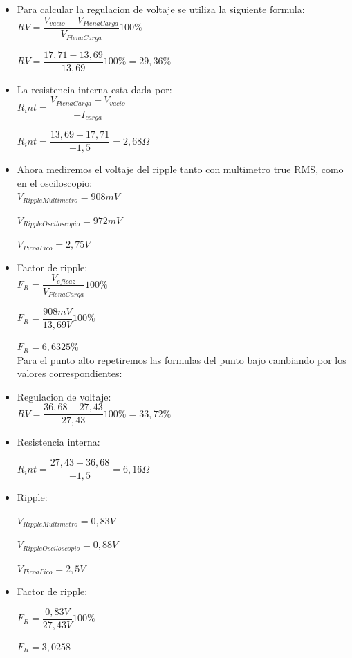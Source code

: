 \begin{itemize}

  \item Para calcular la regulacion de voltaje se utiliza la siguiente formula: \\

$RV = \dfrac{V_{vacio} - V_{PlenaCarga}}{V_{PlenaCarga}} 100\percent $

$RV = \dfrac{17,71 - 13,69}{13,69} 100\percent = 29,36\percent $\\

  \item La resistencia interna esta dada por: \\

$R_int = \dfrac{V_{PlenaCarga} - V_{vacio}}{-I_{carga}}$

$R_int = \dfrac{13,69 - 17,71}{-1,5} = 2,68\Omega $\\

  \item Ahora mediremos el voltaje del ripple tanto con multimetro true RMS, como en el osciloscopio: \\

$V_{RippleMultimetro} = 908 mV$

$V_{RippleOsciloscopio} = 972 mV$

$V_{PicoaPico} = 2,75 V$ \\

  \item Factor de ripple: \\

$F_R = \dfrac{V_{eficaz}}{V_{PlenaCarga}} 100\percent $

$F_R = \dfrac{908 mV}{13,69 V} 100\percent $

$F_R = 6,6325\percent $ \\

Para el punto alto repetiremos las formulas del punto bajo cambiando por los valores correspondientes: \\

  \item Regulacion de voltaje: \\

$RV = \dfrac{36,68 - 27,43}{27,43} 100\percent = 33,72\percent $\\

  \item Resistencia interna:

$R_int = \dfrac{27,43 - 36,68}{-1,5} = 6,16\Omega $\\

  \item Ripple:

$V_{RippleMultimetro} = 0,83 V$

$V_{RippleOsciloscopio} = 0,88 V$

$V_{PicoaPico} = 2,5 V$ \\

  \item Factor de ripple:

$F_R = \dfrac{0,83 V}{27,43 V} 100\percent $

$F_R = 3,0258 $ \\

\end{itemize}

